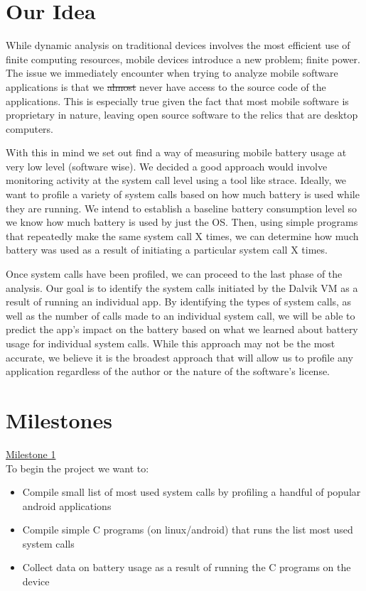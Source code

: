 \documentclass[11pt]{article}
\begin{document}
\section{Our Idea}

While dynamic analysis on traditional devices involves the most efficient use of finite 
computing resources, mobile devices introduce a new problem; finite power. The issue we 
immediately encounter when trying to analyze mobile software applications is that we 
\sout{almost} never have access to the source code of the applications. This is 
especially true given the fact that most mobile software is proprietary in nature, 
leaving open source software to the relics that are desktop computers.

With this in mind we set out find a way of measuring mobile battery usage at very low level
(software wise). We decided a good approach would involve monitoring activity at the system 
call level using a tool like strace. Ideally, we want to profile a variety of system calls 
based on how much battery is used while they are running. We intend to establish a baseline 
battery consumption level so we know how much battery is used by just the OS. Then, using 
simple programs that repeatedly make the same system call X times, we can determine how much 
battery was used as a result of initiating a particular system call X times.

Once system calls have been profiled, we can proceed to the last phase of the analysis. Our 
goal is to identify the system calls initiated by the Dalvik VM as a result of running an 
individual app. By identifying the types of system calls, as well as the number of calls made 
to an individual system call, we will be able to predict the app's impact on the battery based 
on what we learned about battery usage for individual system calls. While this approach may not 
be the most accurate, we believe it is the broadest approach that will allow us to profile any 
application regardless of the author or the nature of the software's license.

\section{Milestones}
\uline{Milestone 1}\\
To begin the project we want to: 
\begin{itemize}
  \item Compile small list of most used system calls by profiling a handful of popular android applications
  \item Compile simple C programs (on linux/android) that runs the list most used system calls
  \item Collect data on battery usage as a result of running the C programs on the device
\end{itemize}
\end{document}
